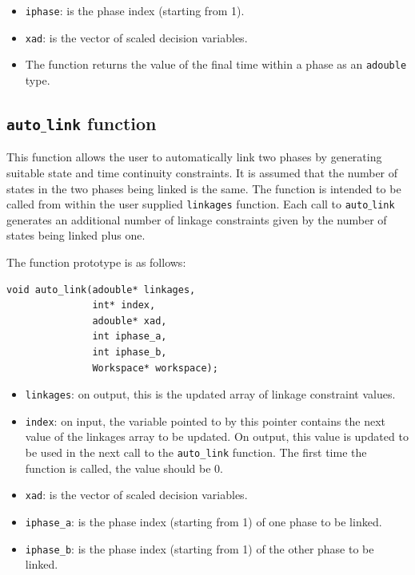 \documentclass[a4paper,11pt]{report}    %
\begin{document}
\begin{itemize}
 \item \verb|iphase|:  is the phase index (starting from 1).
 \item \verb|xad|: is the vector of scaled decision variables.
 \item The function returns the value of the final time within a phase as an \verb|adouble| type.
\end{itemize}



\subsection{ \texttt{auto$\_$link} function}

This function allows the user to automatically link two phases by generating
suitable state and time continuity constraints. It is assumed that
the number of states in the two phases being linked is the same. The function
is intended to be called from within the user supplied \texttt{linkages} function. Each call
to \texttt{auto$\_$link} generates an additional number of linkage constraints given
by the number of states being linked plus one.

The function prototype is as follows:

\begin{verbatim}
void auto_link(adouble* linkages, 
               int* index, 
               adouble* xad, 
               int iphase_a, 
               int iphase_b, 
               Workspace* workspace);
\end{verbatim}

\begin{itemize}
 \item \verb|linkages|: on output, this is the updated array of linkage constraint values.
 \item \verb|index|:    on input, the variable pointed to by this pointer contains the next value of the linkages array to be updated. On output,
this value is updated to be used in the next call to the \verb|auto_link| function. The first time the function is called, the value should be 0.
 \item \verb|xad|: is the vector of scaled decision variables.
 \item \verb|iphase_a|:  is the phase index (starting from 1) of one phase to be linked.
  \item \verb|iphase_b|:  is the phase index (starting from 1) of the other phase to be linked.
\end{itemize}
\end{document}
